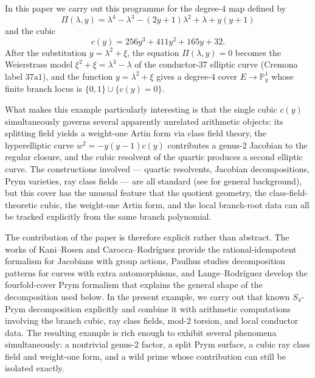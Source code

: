 \documentclass[11pt,letterpaper]{article}
\theoremstyle{plain}
\theoremstyle{remark}
\newcommand{\PP}{\mathbb{P}}
\begin{document}
In this paper we carry out this programme for the degree-\(4\) map defined by
\begin{equation}\label{eq:quartic}
\Pi(\lambda,y)=\lambda^4-\lambda^3-(2y+1)\lambda^2+\lambda+y(y+1)
\end{equation}
and the cubic
\begin{equation}\label{eq:branch-cubic}
c(y)=256y^3+411y^2+165y+32.
\end{equation}
After the substitution \(y=\lambda^2+\xi\), the equation \(\Pi(\lambda,y)=0\) becomes the Weierstrass model \(\xi^2+\xi=\lambda^3-\lambda\) of the conductor-\(37\) elliptic curve (Cremona label \(37\mathrm{a}1\)), and the function \(y=\lambda^2+\xi\) gives a degree-\(4\) cover \(E\to\PP^1_y\) whose finite branch locus is \(\{0,1\}\cup\{c(y)=0\}\).

What makes this example particularly interesting is that the single cubic \(c(y)\) simultaneously governs several apparently unrelated arithmetic objects: its splitting field yields a weight-one Artin form via class field theory, the hyperelliptic curve \(w^2=-y(y-1)c(y)\) contributes a genus-\(2\) Jacobian to the regular closure, and the cubic resolvent of the quartic produces a second elliptic curve. The constructions involved --- quartic resolvents, Jacobian decompositions, Prym varieties, ray class fields --- are all standard (see \cite{Cox2012,KaniRosen1989,Mumford1974,BirkenhakeLange2004,LangeRodriguez2022,Neukirch1999,CaroccaRodriguez2006,Paulhus2008} for general background), but this cover has the unusual feature that the quotient geometry, the class-field-theoretic cubic, the weight-one Artin form, and the local branch-root data can all be tracked explicitly from the same branch polynomial.

The contribution of the paper is therefore explicit rather than abstract. The works of Kani--Rosen \cite{KaniRosen1989} and Carocca--Rodr{\'i}guez \cite{CaroccaRodriguez2006} provide the rational-idempotent formalism for Jacobians with group actions, Paulhus \cite{Paulhus2008} studies decomposition patterns for curves with extra automorphisms, and Lange--Rodr{\'i}guez \cite[Chapter~5, Section~5.7]{LangeRodriguez2022} develop the fourfold-cover Prym formalism that explains the general shape of the decomposition used below. In the present example, we carry out that known \(S_4\)-Prym decomposition explicitly and combine it with arithmetic computations involving the branch cubic, ray class fields, mod-\(2\) torsion, and local conductor data. The resulting example is rich enough to exhibit several phenomena simultaneously: a nontrivial genus-\(2\) factor, a split Prym surface, a cubic ray class field and weight-one form, and a wild prime whose contribution can still be isolated exactly.
\end{document}
